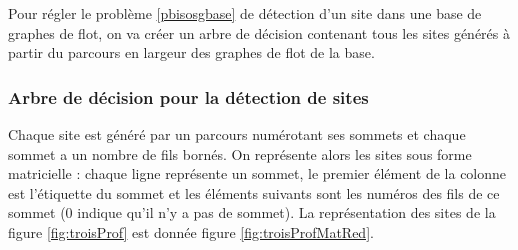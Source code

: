 Pour régler le problème \ref{pbisosgbase} de détection d'un site dans une base de graphes de flot, on va créer un arbre de décision contenant tous les sites générés à partir du parcours en largeur des graphes de flot de la base.

\subsubsection{Arbre de décision pour la détection de sites}
Chaque site est généré par un parcours numérotant ses sommets et chaque sommet a un nombre de fils bornés. On représente alors les sites sous forme matricielle : chaque ligne représente un sommet, le premier élément de la colonne est l'étiquette du sommet et les éléments suivants sont les numéros des fils de ce sommet (0 indique qu'il n'y a pas de sommet). La représentation des sites de la figure \ref{fig:troisProf} est donnée figure \ref{fig:troisProfMatRed}.

